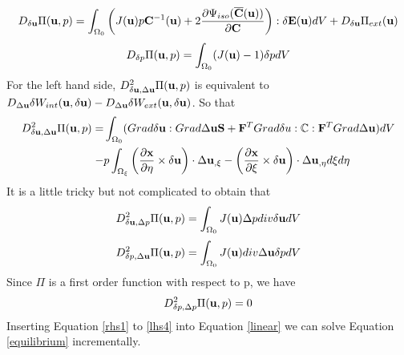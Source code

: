 \begin{equation}\label{rhs1}
D_{\delta\bold{u}}\Pi(\bold{u}, p) = \int_{\Omega_0}\left( J(\bold{u})p\bold{C}^{-1}(\bold{u}) + 
2\frac{\partial{\Psi_{iso}(\overline{\bold{C}}(\bold{u}))}}{\partial{\bold{C}}}  \right) : \delta\bold{E}(\bold{u}) dV + D_{\delta\bold{u}}\Pi_{ext}(\bold{u})
\end{equation}
\begin{equation}\label{rhs2}
D_{\delta{p}}\Pi(\bold{u}, p) = \int_{\Omega_0} (J(\bold{u}) - 1 )\delta{p} dV
\end{equation}
For the left hand side,
$D_{\delta\bold{u}, \Delta\bold{u}}^2 \Pi(\bold{u}, p)$ is equivalent to $D_{\Delta{\bold{u}}}\delta{W_{int}}(\bold{u}, \delta{\bold{u}}) - D_{\Delta{\bold{u}}}\delta{W_{ext}}(\bold{u}, \delta{\bold{u}})$. So that
\begin{equation} \label{lhs1}
\begin{split}
D_{\delta\bold{u}, \Delta\bold{u}}^2 \Pi(\bold{u}, p) = & \int_{\Omega_0}(Grad\delta\bold{u} : Grad\Delta\bold{u}\bold{S} + \bold{F}^TGrad\delta{u} : \mathbb{C} : \bold{F}^T Grad\Delta\bold{u})dV  \\
 - & p\int_{\Omega_{\xi}}  \left(\frac{\partial{\bold{x}}}{\partial{\eta}} \times \delta\bold{u}\right) \cdot\Delta{\bold{u}}_{,\xi} - 
\left(\frac{\partial{\bold{x}}}{\partial{\xi}} \times \delta\bold{u}\right) \cdot\Delta{\bold{u}}_{,\eta} d\xi{d\eta}
\end{split}
\end{equation}
It is a little tricky but not complicated to obtain that
\begin{equation} \label{lhs2}
D_{\delta\bold{u}, \Delta{p}}^2 \Pi(\bold{u}, p) = \int_{\Omega_0} J(\bold{u})\Delta{p}div\delta{\bold{u}}dV
\end{equation}
\begin{equation} \label{lhs3}
D_{\delta{p}, \Delta\bold{u}}^2 \Pi(\bold{u}, p) = \int_{\Omega_0} J(\bold{u})div\Delta{\bold{u}}\delta{p}dV
\end{equation}
Since $\Pi$ is a first order function with respect to p, we have
\begin{equation} \label{lhs4}
D_{\delta{p}, \Delta{p}}^2 \Pi(\bold{u}, p) = 0
\end{equation}
Inserting Equation \ref{rhs1} to \ref{lhs4} into Equation \ref{linear} we can solve Equation \ref{equilibrium} incrementally.

